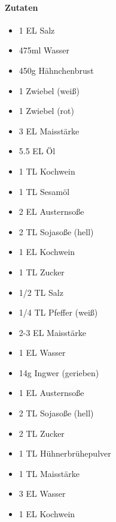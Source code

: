\newpage
{}

\paragraph{Zutaten}
\begin{itemize}[noitemsep]
	\item 1 EL Salz
	\item 475ml Wasser
	\item 450g Hähnchenbrust
	\item 1 Zwiebel (weiß)
	\item 1 Zwiebel (rot)
	\item 3 EL Maisstärke
	\item 5.5 EL Öl
	\item 1 TL Kochwein
	\item 1 TL Sesamöl
	\vspace{0.5cm}
	\item 2 EL Austernsoße
	\item 2 TL Sojasoße (hell)
	\item 1 EL Kochwein
	\item 1 TL Zucker
	\item 1/2 TL Salz
	\item 1/4 TL Pfeffer (weiß)
	\item 2-3 EL Maisstärke
	\item 1 EL Wasser
	\item 14g Ingwer (gerieben)
	\vspace{0.5cm}
	\item 1 EL Austernsoße
	\item 2 TL Sojasoße (hell)
	\item 2 TL Zucker
	\item 1 TL Hühnerbrühepulver
	\item 1 TL Maisstärke
	\item 3 EL Wasser
	\item 1 EL Kochwein
\end{itemize}


